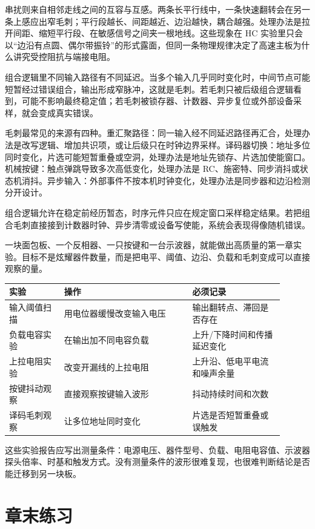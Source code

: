 串扰则来自相邻走线之间的互容与互感。两条长平行线中，一条快速翻转会在另一条上感应出窄毛刺；平行段越长、间距越近、边沿越快，耦合越强。处理办法是拉开间距、缩短平行段、在敏感信号之间夹一根地线。这些现象在 HC 实验里只会以“边沿有点圆、偶尔带振铃”的形式露面，但同一条物理规律决定了高速主板为什么讲究受控阻抗与端接电阻。

组合逻辑里不同输入路径有不同延迟。当多个输入几乎同时变化时，中间节点可能短暂经过错误组合，输出形成窄脉冲，这就是毛刺。若毛刺只被后级组合逻辑看到，可能不影响最终稳定值；若毛刺被锁存器、计数器、异步复位或外部设备采样，就会变成真实错误。

毛刺最常见的来源有四种。重汇聚路径：同一输入经不同延迟路径再汇合，处理办法是改写逻辑、增加共识项，或让后级只在时钟边界采样。译码器切换：地址多位同时变化，片选可能短暂重叠或空洞，处理办法是地址先锁存、片选加使能窗口。机械按键：触点弹跳导致多次高低变化，处理办法是 RC、施密特、同步消抖或状态机消抖。异步输入：外部事件不按本机时钟变化，处理办法是同步器和边沿检测分开设计。

组合逻辑允许在稳定前经历暂态，时序元件只应在规定窗口采样稳定结果。若把组合毛刺直接接到计数器时钟、异步清零或设备写使能，系统会表现得像随机错误。

一块面包板、一个反相器、一只按键和一台示波器，就能做出高质量的第一章实验。目标不是炫耀器件数量，而是把电平、阈值、边沿、负载和毛刺变成可以直接观察的量。

\begin{longtable}{L{0.18\linewidth}L{0.42\linewidth}L{0.3\linewidth}}
\toprule
实验 & 操作 & 必须记录 \\
\midrule
输入阈值扫描 & 用电位器缓慢改变输入电压 & 输出翻转点、滞回是否存在 \\
负载电容实验 & 在输出加不同电容负载 & 上升/下降时间和传播延迟变化 \\
上拉电阻实验 & 改变开漏线的上拉电阻 & 上升沿、低电平电流和噪声余量 \\
按键抖动观察 & 直接观察按键输入波形 & 抖动持续时间和次数 \\
译码毛刺观察 & 让多位地址同时变化 & 片选是否短暂重叠或误触发 \\
\bottomrule
\end{longtable}

这些实验报告应写出测量条件：电源电压、器件型号、负载、电阻电容值、示波器探头倍率、时基和触发方式。没有测量条件的波形很难复现，也很难判断结论是否能迁移到另一块板。

\section*{章末练习}

